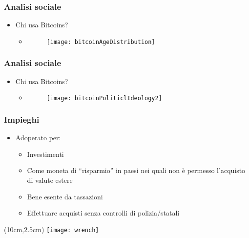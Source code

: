 \begin{frame}
 \frametitle{Analisi sociale}

 \begin{itemize}
  \item Chi usa Bitcoins?
  \begin{itemize}
   \item[]
   \begin{figure}
    \centering
    \texttt{[image: bitcoinAgeDistribution]}
   \end{figure}

  \end{itemize}

 \end{itemize}

\end{frame}


\begin{frame}
 \frametitle{Analisi sociale}

 \begin{itemize}
  \item Chi usa Bitcoins?
  \begin{itemize}
   \item[]
   \begin{figure}
    \centering
    \texttt{[image: bitcoinPoliticlIdeology2]}
   \end{figure}

  \end{itemize}

 \end{itemize}

\end{frame}


\begin{frame}
 \frametitle{Impieghi}

 \begin{itemize}
  \item<1-> Adoperato per:
  \begin{itemize}
   \item<2-> Investimenti
   \item<3-> Come moneta di ``risparmio'' in paesi nei quali non \`e permesso
l'acquisto di valute estere
   \item<4-> Bene esente da tassazioni
   \item<5-> Effettuare acquisti senza controlli di polizia/statali
  \end{itemize}

 \end{itemize}


 \begin{textblock*}{5cm}(10cm,2.5cm)
  \texttt{[image: wrench]}
 \end{textblock*}

\end{frame}
